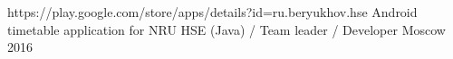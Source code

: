 \begin{cventries}

\cventry
{https://play.google.com/store/apps/details?id=ru.beryukhov.hse} %
{Android timetable application for NRU HSE (Java) / Team leader / Developer} %
{Moscow} %
{2016} %
{}













\end{cventries}
